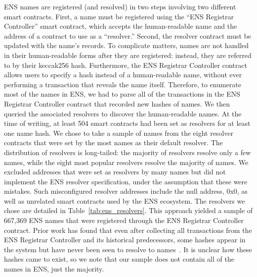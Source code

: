 ENS names are registered (and resolved) in two steps involving two different 
smart contracts. First, a name must be registered using the ``ENS Registrar 
Controller'' smart contract, which accepts the human-readable name and the 
address of a contract to use as a ``resolver.'' Second, the 
resolver
contract must be updated with the name's records. To complicate matters, names 
are not handled in their human-readable forms after they are registered: 
instead, they are referred to by their keccak256 hash.  
Furthermore, the ENS 
Registrar Controller contract allows users to specify a 
hash instead of a human-readable name, without ever performing a transaction 
that reveals the name itself. Therefore, to enumerate most of the names in ENS, 
we had to parse all of the transactions in the ENS Registrar 
Controller 
contract that recorded new hashes of names. We then queried the associated 
resolvers to discover the human-readable names. At the time of writing, at 
least 504 smart contracts had been set as resolvers for at least one name hash.
We chose to take a sample of names from the eight resolver contracts that were 
set by the most names as their default resolver. The distribution of resolvers 
is long-tailed: the majority of resolvers resolve only a few names, while the 
eight most popular resolvers resolve the majority of names. We excluded 
addresses that were set as resolvers by many names but did not implement the 
ENS resolver specification, under the assumption that these were mistakes. 
Such misconfigured resolver addresses include the null 
address, 0x0, as well as unrelated smart contracts used by 
the ENS ecosystem. The resolvers we 
chose are detailed in Table~\ref{tab:ens_resolvers}. This 
approach yielded a 
sample of 667,369 ENS names that were registered through the 
ENS Registrar Controller contract. Prior work has found that 
even after collecting all transactions from 
the ENS Registrar Controller and its historical 
predecessors, some hashes appear in the system but have never been seen to 
resolve to 
names~\cite{xia_ens_2022}. It is unclear how these 
hashes came to exist, so we note that our sample does not 
contain all of the names in ENS, just the majority.



